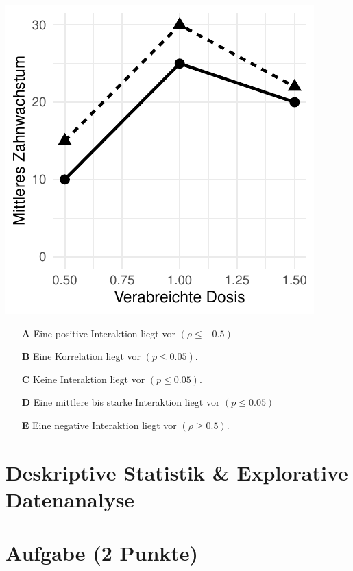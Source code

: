 \documentclass[a4paper, 9pt]{scrartcl}\usepackage[]{graphicx}\usepackage[]{xcolor}
\makeatletter
\def\maxwidth{ %
  \ifdim\Gin@nat@width>\linewidth
    \linewidth
  \else
    \Gin@nat@width
  \fi
}
\makeatother
\begin{document}
{\centering \includegraphics[width=\maxwidth]{img/mc-anova-02-a-1} 

}







\begin{enumerate}
\item [\textbf{A} \msquare] Eine positive Interaktion liegt vor $(\rho \leq -0.5)$ 
\item [\textbf{B} \msquare] Eine Korrelation liegt vor $(p \leq 0.05)$.
\item [\textbf{C} \msquare] Keine Interaktion liegt vor $(p \leq 0.05)$.
\item [\textbf{D} \msquare] Eine mittlere bis starke Interaktion liegt vor $(p \leq 0.05)$
\item [\textbf{E} \msquare] Eine negative Interaktion liegt vor $(\rho \geq 0.5)$.
\end{enumerate} 
\section*{Deskriptive Statistik \& Explorative Datenanalyse}

\section{Aufgabe \hfill (2 Punkte)}
\end{document}
